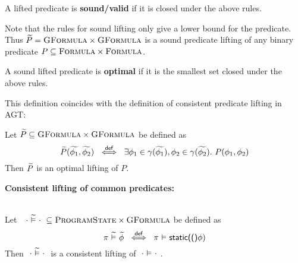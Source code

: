 \begin{definition}
    A lifted predicate is \textbf{sound/valid} if it is closed under the above rules.
\end{definition}

Note that the rules for sound lifting only give a lower bound for the predicate.
Thus $\widetilde{P} = \textsc{GFormula} \times \textsc{GFormula}$ is a sound predicate lifting of any binary predicate $P \subseteq \textsc{Formula} \times \textsc{Formula}$.

\begin{definition}
    A sound lifted predicate is \textbf{optimal} if it is the smallest set closed under the above rules.
\end{definition}

This definition coincides with the definition of consistent predicate lifting in AGT:

\begin{lemma}\label{lemma:consistent-pred-lifting-direct}
    Let $\widetilde{P} \subseteq \textsc{GFormula} \times \textsc{GFormula}$ be defined as
    \begin{displaymath} 
    \widetilde{P}(\widetilde{\phi_1}, \widetilde{\phi_2}) ~\overset{\textup{\textsf{def}}}{\iff}~ \exists \phi_1 \in \gamma(\widetilde{\phi_1}), \phi_2 \in \gamma(\widetilde{\phi_2}).~ P(\phi_1, \phi_2)
    \end{displaymath}
    Then $\widetilde{P}$ is an optimal lifting of $P$.
\end{lemma} %



\textbf{Consistent lifting of common predicates:}

\begin{lemma}~\\
    Let $~~\cdot \,\,\widetilde{\vDash}\,\, \cdot~ \subseteq \textsc{ProgramState} \times \textsc{GFormula}$ be defined as
    \begin{displaymath} 
    \pi \,\,\widetilde{\vDash}\,\, \widetilde{\phi} ~\overset{\textup{\textsf{def}}}{\iff}~ \pi \,\,{\vDash}\,\, \textup{\textsf{static(()}}\phi)
    \end{displaymath}
    Then $~\cdot \,\,\widetilde{\vDash}\,\, \cdot~$ is a consistent lifting of $~\cdot \,\,{\vDash}\,\, \cdot~$.
\end{lemma}

